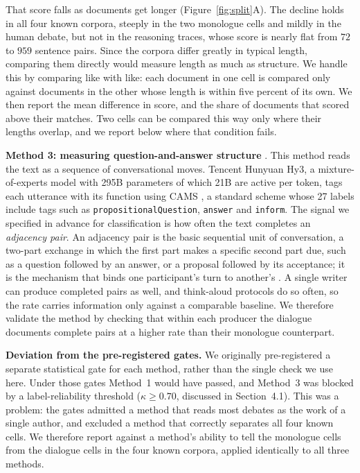 \documentclass[10pt,twocolumn]{article}
\begin{document}
That score falls as documents get longer (Figure~\ref{fig:split}A). The decline holds in all four
known corpora, steeply in the
two monologue cells and mildly in the human debate, but not in the reasoning traces, whose score is
nearly flat from $72$ to $959$ sentence pairs. Since the corpora differ greatly in typical length,
comparing them directly would measure length as much as structure. We handle this by comparing like
with like: each document in one cell is compared only against documents in the other whose length is
within five percent of its own. We then report the mean difference in score, and the share of
documents that scored above their matches. Two cells can be compared this way
only where their lengths overlap, and we report below where that condition fails.

\textbf{Method 3: measuring question-and-answer structure} \cite{schegloff1973}. This method reads
the text as a sequence of conversational moves. Tencent Hunyuan Hy3, a mixture-of-experts model with
295B parameters of which 21B are active per token, tags each utterance with its function using CAMS
\cite{duran2022}, a standard scheme whose 27 labels include tags such as
\texttt{propositionalQuestion}, \texttt{answer} and \texttt{inform}. The signal we specified in
advance for classification is how often the text completes an \emph{adjacency pair}. An adjacency pair is the basic
sequential unit of conversation, a two-part exchange in which the first part makes a specific second
part due, such as a question followed by an answer, or a proposal followed by its acceptance; it is
the mechanism that binds one participant's turn to another's \cite{schegloff1973}. A single writer can produce completed pairs as well, and think-aloud
protocols do so often, so the rate carries information only against a comparable baseline. We
therefore validate the method by checking that within each producer the dialogue documents complete
pairs at a higher rate than their monologue counterpart.

\textbf{Deviation from the pre-registered gates.} We originally pre-registered a separate statistical
gate for each method, rather than the single check we use here. Under those gates Method~1 would have
passed, and Method~3 was blocked by a label-reliability threshold ($\kappa \ge 0.70$, discussed in
Section~4.1). This was a problem: the gates admitted a method that reads most debates as the work of
a single author, and excluded a method that correctly separates all four known cells. We therefore
report against a method's ability to tell the monologue cells from the dialogue cells in the four
known corpora, applied identically to all three methods.
\end{document}
